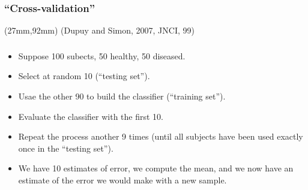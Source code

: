 \begin{frame}
  \frametitle{``Cross-validation''}
  \vspace*{-5cm}
  
  \TPMargin{0pt}
  \begin{textblock*}{43mm}(27mm,92mm)
    {\tiny(Dupuy and Simon, 2007, JNCI, 99)}
  \end{textblock*}

  
\end{frame}


\begin{frame}
\frametitle{}
\begin{itemize}
\item Suppose 100 subects, 50 healthy, 50 diseased.
\item Select at random 10 (``testing set'').
\item Usae the other 90 to build the classifier (``training set'').
\item Evaluate the classifier with the first 10.
\item Repeat the process another 9 times (until all subjects have been
  used exactly once in the ``testing set'').
\item We have 10 estimates of error, we compute the mean, and we now have
  an estimate of the error we would make with a new sample.
\end{itemize}
\end{frame}




